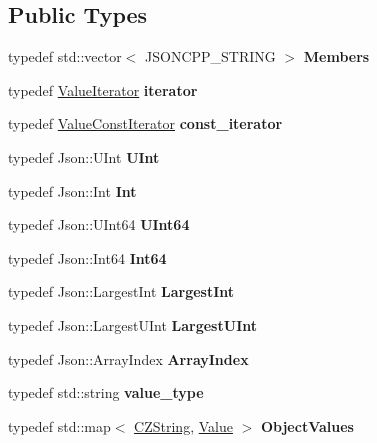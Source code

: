 \subsection*{Public Types}
\begin{DoxyCompactItemize}
\item 
\mbox{\label{classJson_1_1Value_a9ae9069983fc38f1928d76f9c79ac64d}} 
typedef std\+::vector$<$ J\+S\+O\+N\+C\+P\+P\+\_\+\+S\+T\+R\+I\+NG $>$ {\bfseries Members}
\item 
\mbox{\label{classJson_1_1Value_a341cdf2e01f8b3c5b7317aa2f0768c53}} 
typedef \hyperlink{classJson_1_1ValueIterator}{Value\+Iterator} {\bfseries iterator}
\item 
\mbox{\label{classJson_1_1Value_af92282ca92b58b320debd486afb7696a}} 
typedef \hyperlink{classJson_1_1ValueConstIterator}{Value\+Const\+Iterator} {\bfseries const\+\_\+iterator}
\item 
\mbox{\label{classJson_1_1Value_a0933d59b45793ae4aade1757c322a98d}} 
typedef Json\+::\+U\+Int {\bfseries U\+Int}
\item 
\mbox{\label{classJson_1_1Value_abdf7a7ff73eb130ffcab28504ffdb405}} 
typedef Json\+::\+Int {\bfseries Int}
\item 
\mbox{\label{classJson_1_1Value_a8b62564be8c087c6d18de180ff4e13e3}} 
typedef Json\+::\+U\+Int64 {\bfseries U\+Int64}
\item 
\mbox{\label{classJson_1_1Value_a1b86af9f85f0f1baa972c3319fa22695}} 
typedef Json\+::\+Int64 {\bfseries Int64}
\item 
\mbox{\label{classJson_1_1Value_a1cbb82642ed05109b9833e49f042ece7}} 
typedef Json\+::\+Largest\+Int {\bfseries Largest\+Int}
\item 
\mbox{\label{classJson_1_1Value_a6682a3684d635e03fc06ba229fa24eec}} 
typedef Json\+::\+Largest\+U\+Int {\bfseries Largest\+U\+Int}
\item 
\mbox{\label{classJson_1_1Value_a184a91566cccca7b819240f0d5561c7d}} 
typedef Json\+::\+Array\+Index {\bfseries Array\+Index}
\item 
\mbox{\label{classJson_1_1Value_a9e071ef3c135a2c9602e893b6005d0f7}} 
typedef std\+::string {\bfseries value\+\_\+type}
\item 
\mbox{\label{classJson_1_1Value_a08b6c80c3af7071d908dabf044de5388}} 
typedef std\+::map$<$ \hyperlink{classJson_1_1Value_1_1CZString}{C\+Z\+String}, \hyperlink{classJson_1_1Value}{Value} $>$ {\bfseries Object\+Values}
\end{DoxyCompactItemize}
